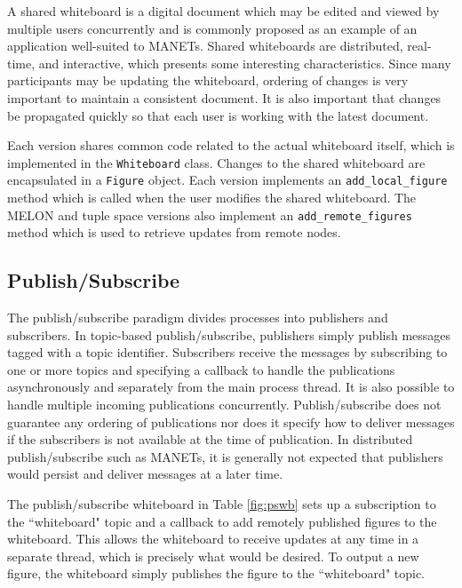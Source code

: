A shared whiteboard is a digital document which may be edited and viewed by multiple users concurrently and is commonly proposed as an example of an application well-suited to MANETs\cite{wb5}\cite{wb6}. Shared whiteboards are distributed, real-time, and interactive, which presents some interesting characteristics. Since many participants may be updating the whiteboard, ordering of changes is very important to maintain a consistent document. It is also important that changes be propagated quickly so that each user is working with the latest document.

Each version shares common code related to the actual whiteboard itself, which is implemented in the \texttt{Whiteboard} class. Changes to the shared whiteboard are encapsulated in a \texttt{Figure} object. Each version implements an \texttt{add\_local\_figure} method which is called when the user modifies the shared whiteboard. The MELON and tuple space versions also implement an \texttt{add\_remote\_figures} method which is used to retrieve updates from remote nodes.

\subsection{Publish/Subscribe}

The publish/subscribe paradigm divides processes into publishers and subscribers. In topic-based publish/subscribe, publishers simply publish messages tagged with a topic identifier. Subscribers receive the messages by subscribing to one or more topics and specifying a callback to handle the publications asynchronously and separately from the main process thread. It is also possible to handle multiple incoming publications concurrently. Publish/subscribe does not guarantee any ordering of publications nor does it specify how to deliver messages if the subscribers is not available at the time of publication. In distributed publish/subscribe such as MANETs, it is generally not expected that publishers would persist and deliver messages at a later time\cite{psfaces}.

The publish/subscribe whiteboard in Table \ref{fig:pswb} sets up a subscription to the ``whiteboard" topic and a callback to add remotely published figures to the whiteboard. This allows the whiteboard to receive updates at any time in a separate thread, which is precisely what would be desired. To output a new figure, the whiteboard simply publishes the figure to the ``whiteboard" topic.

